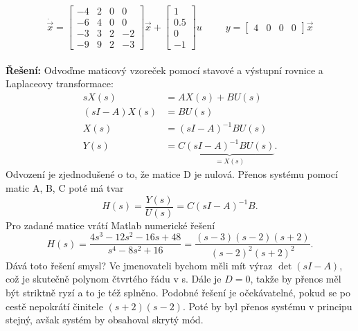 \documentclass[twoside]{article}
\begin{document}
\begin{equation*}
	\dot{\vec{x}} = \begin{bmatrix}
		-4 & 2 & 0 & 0 \\
		-6 & 4 & 0 & 0 \\
		-3 & 3 & 2 & -2 \\
		-9 & 9 & 2 & -3
	\end{bmatrix} \vec{x} + \begin{bmatrix}
		1 \\
		0.5 \\
	0 \\
	-1
\end{bmatrix} u ~~~~~~~~~~~
y = \begin{bmatrix}
	4 & 0 & 0 & 0
\end{bmatrix} \vec{x}
\end{equation*} \\
\textbf{Řešení:} Odvoďme maticový vzoreček pomocí stavové a výstupní rovnice a Laplaceovy transformace:
\begin{equation*}
	\begin{split}
		sX(s) &= AX(s) + B U(s) \\
		(sI - A) X(s) &= BU(s) \\
		X(s) &= (sI - A)^{-1} B U(s) \\
		Y(s) &= C \underbrace{(sI - A)^{-1} B U(s)}_{=X(s)}.
	\end{split}
\end{equation*}
Odvození je zjednodušené o to, že matice D je nulová. Přenos systému pomocí matic A, B, C poté má tvar
\begin{equation*}
	H(s) = \frac{Y(s)}{U(s)} = C(sI-A)^{-1} B.
\end{equation*}
Pro zadané matice vrátí Matlab numerické řešení
\begin{equation*}
	H(s) = \frac{4 s^3 - 12 s^2 - 16s + 48}{s^4 - 8 s^2 + 16} = \frac{(s-3)(s-2)(s+2)}{(s-2)^2(s+2)^2}.
\end{equation*}
Dává toto řešení smysl? Ve jmenovateli bychom měli mít výraz $ \det(sI - A)$, což je skutečně polynom čtvrtého
řádu v s. Dále je $D = 0$, takže by přenos měl být striktně ryzí a to je též splněno. Podobné řešení je očekávatelné,
pokud se po cestě nepokrátí činitele $(s+2)(s-2)$. Poté by byl přenos systému v principu stejný, avšak systém by obsahoval skrytý mód.
\end{document}
